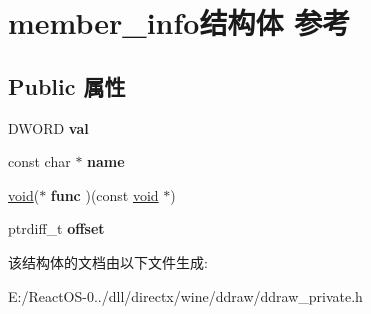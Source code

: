 \hypertarget{structmember__info}{}\section{member\+\_\+info结构体 参考}
\label{structmember__info}
\subsection*{Public 属性}
\begin{DoxyCompactItemize}
\item 
\mbox{\label{structmember__info_ac1c92a5befb9a6ec215d4682a36e4ae1}} 
D\+W\+O\+RD {\bfseries val}
\item 
\mbox{\label{structmember__info_af54fc27dd8b5ed90b1a972631e41ee2d}} 
const char $\ast$ {\bfseries name}
\item 
\mbox{\label{structmember__info_a18c1b8db01167bb8d9b4e94b14a20028}} 
\hyperlink{interfacevoid}{void}($\ast$ {\bfseries func} )(const \hyperlink{interfacevoid}{void} $\ast$)
\item 
\mbox{\label{structmember__info_a7ba216ab6bb31606b1925aea3820a798}} 
ptrdiff\+\_\+t {\bfseries offset}
\end{DoxyCompactItemize}


该结构体的文档由以下文件生成\+:\begin{DoxyCompactItemize}
\item 
E\+:/\+React\+O\+S-\/0../dll/directx/wine/ddraw/ddraw\+\_\+private.\+h\end{DoxyCompactItemize}
